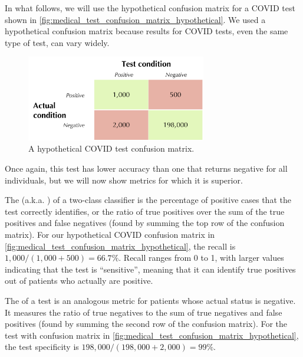 In what follows, we will use the hypothetical confusion matrix for a COVID test shown in \autoref{fig:medical_test_confusion_matrix_hypothetical}. We used a hypothetical confusion matrix because results for COVID tests, even the same type of test, can vary widely.\\

\begin{figure}[h]
\centering
\mySfFamily
\includegraphics[width = 0.7\textwidth]{../images/medical_test_confusion_matrix_hypothetical.png}
\caption{A hypothetical COVID test confusion matrix.}
\label{fig:medical_test_confusion_matrix_hypothetical}
\end{figure}

\begin{qbox}\end{qbox}

Once again, this test has lower accuracy than one that returns negative for all individuals, but we will now show metrics for which it is superior.

The  (a.k.a. ) of a two-class classifier is the percentage of positive cases that the test correctly identifies, or the ratio of true positives over the sum of the true positives and false negatives (found by summing the top row of the confusion matrix). For our hypothetical COVID confusion matrix in \autoref{fig:medical_test_confusion_matrix_hypothetical}, the recall is $1,000/(1,000 + 500) = 66.7\%$. Recall ranges from 0 to 1, with larger values indicating that the test is ``sensitive'', meaning that it can identify true positives out of patients who actually are positive.

The  of a test is an analogous metric for patients whose actual status is negative. It measures the ratio of true negatives to the sum of true negatives and false positives (found by summing the second row of the confusion matrix). For the test with confusion matrix in \autoref{fig:medical_test_confusion_matrix_hypothetical}, the test specificity is $198,000/(198,000 + 2,000) = 99\%$.

